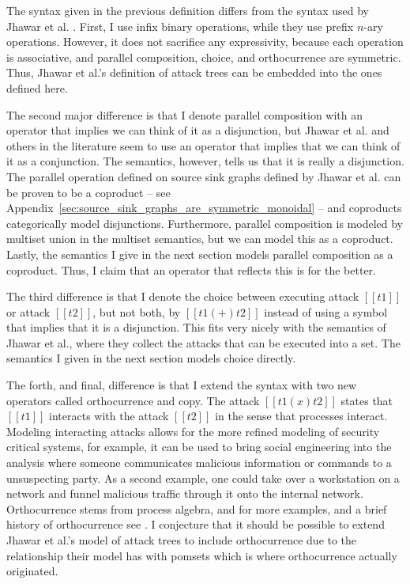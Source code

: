 \documentclass{llncs}
\begin{document}
The syntax given in the previous definition differs from the syntax
used by Jhawar et al. \cite{Jhawar:2015}.  First, I use infix binary
operations, while they use prefix $n$-ary operations. However, it does
not sacrifice any expressivity, because each operation is associative,
and parallel composition, choice, and orthocurrence are symmetric.
Thus, Jhawar et al.'s definition of attack trees can be embedded into
the ones defined here.%

The second major difference is that I denote parallel composition with
an operator that implies we can think of it as a disjunction, but
Jhawar et al. and others in the literature seem to use an operator
that implies that we can think of it as a conjunction.  The semantics,
however, tells us that it is really a disjunction.  The parallel
operation defined on source sink graphs defined by Jhawar et
al. \cite{Jhawar:2015} can be proven to be a coproduct -- see
Appendix~\ref{sec:source_sink_graphs_are_symmetric_monoidal} -- and
coproducts categorically model disjunctions.  Furthermore, parallel
composition is modeled by multiset union in the multiset semantics,
but we can model this as a coproduct.  Lastly, the semantics I give in
the next section models parallel composition as a coproduct.  Thus, I
claim that an operator that reflects this is for the better.

The third difference is that I denote the choice between executing
attack $[[t1]]$ or attack $[[t2]]$, but not both, by $[[t1 (+) t2]]$
instead of using a symbol that implies that it is a disjunction.  This
fits very nicely with the semantics of Jhawar et al., where they
collect the attacks that can be executed into a set.  The semantics I
given in the next section models choice directly.

The forth, and final, difference is that I extend the syntax with two
new operators called orthocurrence and copy.  The attack $[[t1 (x)
    t2]]$ states that $[[t1]]$ interacts with the attack $[[t2]]$ in
the sense that processes interact.  Modeling interacting attacks
allows for the more refined modeling of security critical systems, for
example, it can be used to bring social engineering into the analysis
where someone communicates malicious information or commands to a
unsuspecting party.  As a second example, one could take over a
workstation on a network and funnel malicious traffic through it onto
the internal network.  Orthocurrence stems from process algebra, and
for more examples, and a brief history of orthocurrence see
\cite{Pratt:2001}.  I conjecture that it should be possible to extend
Jhawar et al.'s model of attack trees to include orthocurrence due to
the relationship their model has with pomsets which is where
orthocurrence actually originated.
\end{document}
